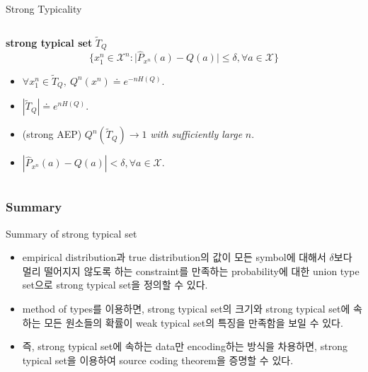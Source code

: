 \documentclass[9pt]{beamer}
\begin{document}
\begin{section}{Strong Typicality}
\begin{frame}
\begin{columns}
                \begin{column}{0.5\textwidth}
                    \textbf{ strong typical set} $\tilde T_Q$
                    \vspace{0.2cm}
                    {\footnotesize {$$ { \Big\{ x_1^n \in \mathcal X^n : \big|\hat P_{x^n}(a) - Q(a)\big| \le \delta, \forall a \in \mathcal X \Big\}}$$}}
                    \begin{itemize}
                        \item $\forall x_1^n \in \tilde T_Q,\ Q^n (x^n) \doteq e^{-nH(Q)}.$
                        \item $|\tilde T_Q| \doteq e^{nH(Q)}.$
                        \item (strong AEP) $Q^n (\tilde T_Q) \rightarrow 1$ \textit{with sufficiently large} $n$.
                        \item \alert{$|\hat P_{x^n} (a) - Q(a) | < \delta, \forall a \in \mathcal X$}.
                    \end{itemize}
                \end{column} 
            \end{columns}
        \end{frame}

        \begin{frame}
            \frametitle{Summary}
                \begin{block}{Summary of strong typical set}
                    \begin{itemize}
                        \item empirical distribution과 true distribution의 값이 모든 symbol에 대해서 $\delta$보다 멀리 떨어지지 않도록 하는 constraint를 만족하는 probability에 대한 union type set으로 strong typical set을 정의할 수 있다.
                        \item method of types를 이용하면, strong typical set의 크기와 strong typical set에 속하는 모든 원소들의 확률이 weak typical set의 특징을 만족함을 보일 수 있다.
                        \item 즉, strong typical set에 속하는 data만 encoding하는 방식을 차용하면, strong typical set을 이용하여 source coding theorem을 증명할 수 있다.
                    \end{itemize}
                \end{block}
        \end{frame}
    \end{section}
\end{document}
